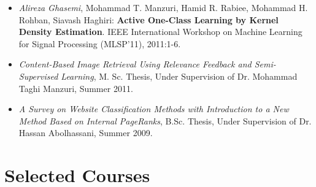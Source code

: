 \documentclass[11pt,a4paper,sans]{moderncv}        %
\begin{document}
{\begin{itemize}
\item \textit{Alireza Ghasemi}, Mohammad T. Manzuri, Hamid R. Rabiee, Mohammad H. Rohban, Siavash Haghiri: \textbf{Active One-Class Learning by Kernel Density Estimation}. IEEE International Workshop on Machine Learning for Signal Processing (MLSP'11), 2011:1-6.
\vspace*{5pt}

\end{itemize}
}


{
\begin{itemize}
\item \emph{Content-Based Image Retrieval Using Relevance Feedback and Semi-Supervised Learning}, M. Sc. Thesis, Under Supervision of Dr. Mohammad Taghi Manzuri, Summer 2011.
\item \emph{A Survey on Website Classification Methods with Introduction to a  New Method Based on Internal PageRanks}, B.Sc. Thesis, Under Supervision of Dr. Hassan Abolhassani, Summer 2009.\vspace*{10pt}
\end{itemize}
}



\section{Selected Courses}
\vspace*{10pt}
\end{document}
